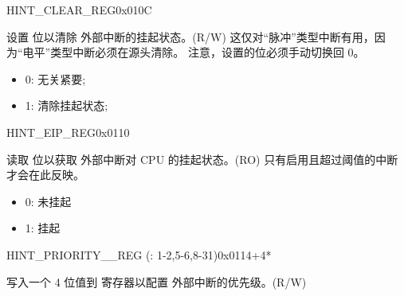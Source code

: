\begin{register}{H}{INT\_CLEAR\_REG}{0x010C}\label{regdesc:INTCLEARREG}
%
%
%
%
%
%
\regnewline%
\begin{regdesc}
\begin{reglist}
\item [INT\_CLEAR\lbrack\regindex{n}\rbrack] 设置  位以清除  外部中断的挂起状态。(R/W) \newline 这仅对“脉冲”类型中断有用，因为“电平”类型中断必须在源头清除。 \newline 注意，设置的位必须手动切换回 0。
\begin{itemize}
    \setlength\itemsep{-1em}
    \item 0: 无关紧要;
    \item 1: 清除挂起状态;
\end{itemize}
\end{reglist}
\end{regdesc}
\end{register}

\begin{register}{H}{INT\_EIP\_REG}{0x0110}\label{regdesc:INTEIPREG}
%
%
%
%
%
%
\regnewline%
\begin{regdesc}
\begin{reglist}
\item [INT\_EIP\lbrack\regindex{n}\rbrack] 读取  位以获取  外部中断对 CPU 的挂起状态。(RO) \newline 只有启用且超过阈值的中断才会在此反映。
\begin{itemize}
    \setlength\itemsep{-1em}
    \item 0: 未挂起
    \item 1: 挂起
\end{itemize}
\end{reglist}
\end{regdesc}
\end{register}

\begin{register}{H}{INT\_PRIORITY\_\_REG (: 1-2,5-6,8-31)}{0x0114+4*}\label{regdesc:INTPRIORITYREG}
%
%
\regnewline%
\begin{regdesc}
\begin{reglist}
\label{fielddesc:INTPRIORITY}\item [INT\_PRIORITY\_\regindex{n}] 写入一个 4 位值到  寄存器以配置  外部中断的优先级。(R/W)
\end{reglist}
\end{regdesc}
\end{register}

